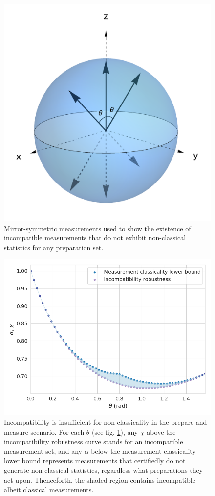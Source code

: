\documentclass[a4paper,preprintnumbers,floatfix,superscriptaddress,pra,twocolumn,showpacs,notitlepage,longbibliography]{revtex4-2}
\begin{document}
        \begin{figure}
            \centering
            \includegraphics[width=.8\columnwidth]{mirror-symmetric-measurements.png}
            \caption{Mirror-symmetric measurements used to show the existence of incompatible measurements that do not exhibit non-classical statistics for any preparation set.}
            \label{fig:mirror-symmetric-measurements}
        \end{figure}
        
        \begin{figure}
            \centering
            \includegraphics[width=\columnwidth]{incompatibility-vs-classicality.png}
            \caption{Incompatibility is insufficient for non-classicality in the prepare and measure scenario. For each $\theta$ (see fig. \ref{fig:mirror-symmetric-measurements}), any $\chi$ above the incompatibility robustness curve stands for an incompatible measurement set, and any $\alpha$ below the measurement classicality lower bound represents measurements that certifiedly do not generate non-classical statistics, regardless what preparations they act upon. Thenceforth, the shaded region contains incompatible albeit classical measurements.}
            \label{fig:incompatibility-vs-classicality}
        \end{figure}
\end{document}
